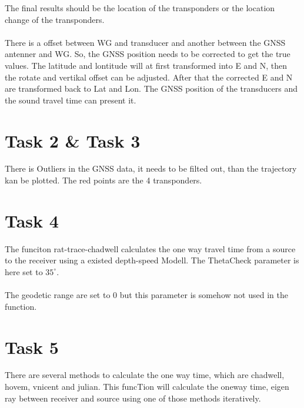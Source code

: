 The final results should be the location of the transponders or the location change of the transponders. \\\\
There is a offset between WG and transducer and another between the GNSS antenner and WG. So, the GNSS position needs to be corrected to get the true values. The latitude and lontitude will at first transformed into E and N, then the rotate and vertikal offset can be adjusted. After that the corrected E and N are transformed back to Lat and Lon. The GNSS position of the transducers and the sound travel time can present it.
\clearpage
\section*{Task 2 \& Task 3}
There is Outliers in the GNSS data, it needs to be filted out, than the trajectory kan be plotted. The red points are the 4 transponders.
\begin{figure}[htpb]\centering
\end{figure}
\clearpage
\section*{Task 4}
The funciton rat-trace-chadwell calculates the one way travel time from a source to the receiver using a existed depth-speed Modell. The ThetaCheck parameter is here set to $35^{\circ}$.\\\\
The geodetic range are set to 0 but this parameter is somehow not used in the function.
\begin{figure}[htpb]\centering
\end{figure}
\clearpage
\section*{Task 5}
There are several methods to calculate the one way time, which are chadwell, hovem, vnicent and julian. This funcTion will calculate the oneway time, eigen ray between receiver and source using one of those methods iteratively. 